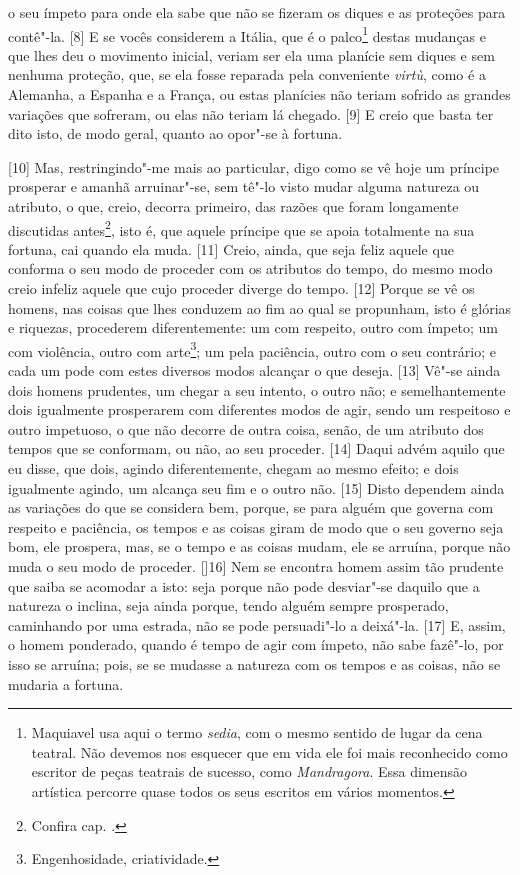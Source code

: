 o seu ímpeto para onde ela sabe que não se fizeram os diques e as
proteções para contê"-la. {[}8{]} E se vocês considerem a Itália, que é o
palco\footnote{Maquiavel usa aqui o termo \emph{sedia}, com o mesmo
  sentido de lugar da cena teatral. Não devemos nos esquecer que em vida
  ele foi mais reconhecido como escritor de peças teatrais de sucesso,
  como \emph{Mandragora}. Essa dimensão artística percorre quase todos
  os seus escritos em vários momentos.} destas mudanças e que lhes deu o
movimento inicial, veriam ser ela uma planície sem diques e sem nenhuma
proteção, que, se ela fosse reparada pela conveniente \emph{virtù}, como
é a Alemanha, a Espanha e a França, ou estas planícies não teriam
sofrido as grandes variações que sofreram, ou elas não teriam lá
chegado. {[}9{]} E creio que basta ter dito isto, de modo geral, quanto
ao opor"-se à fortuna.

{[}10{]} Mas, restringindo"-me mais ao particular, digo como se vê hoje
um príncipe prosperar e amanhã arruinar"-se, sem tê"-lo visto mudar alguma
natureza ou atributo, o que, creio, decorra primeiro, das razões que
foram longamente discutidas antes\footnote{Confira cap. .}, isto é,
que aquele príncipe que se apoia totalmente na sua fortuna, cai quando
ela muda. {[}11{]} Creio, ainda, que seja feliz aquele que conforma o
seu modo de proceder com os atributos do tempo, do mesmo modo creio
infeliz aquele que cujo proceder diverge do tempo. {[}12{]} Porque se vê
os homens, nas coisas que lhes conduzem ao fim ao qual se propunham,
isto é glórias e riquezas, procederem diferentemente: um com respeito,
outro com ímpeto; um com violência, outro com arte\footnote{Engenhosidade,
  criatividade.}; um pela paciência, outro com o seu contrário; e cada
um pode com estes diversos modos alcançar o que deseja. {[}13{]} Vê"-se
ainda dois homens prudentes, um chegar a seu intento, o outro não; e
semelhantemente dois igualmente prosperarem com diferentes modos de
agir, sendo um respeitoso e outro impetuoso, o que não decorre de outra
coisa, senão, de um atributo dos tempos que se conformam, ou não, ao seu
proceder. {[}14{]} Daqui advém aquilo que eu disse, que dois, agindo
diferentemente, chegam ao mesmo efeito; e dois igualmente agindo, um
alcança seu fim e o outro não. {[}15{]} Disto dependem ainda as
variações do que se considera bem, porque, se para alguém que governa
com respeito e paciência, os tempos e as coisas giram de modo que o seu
governo seja bom, ele prospera, mas, se o tempo e as coisas mudam, ele
se arruína, porque não muda o seu modo de proceder. {[]}16{]} Nem se encontra homem assim tão prudente que saiba se acomodar a isto: seja porque não pode desviar"-se daquilo que a natureza o inclina, seja ainda porque, tendo alguém sempre prosperado, caminhando por uma estrada, não se pode persuadi"-lo a deixá"-la. {[}17{]} E, assim, o homem ponderado, quando é tempo de agir com ímpeto, não sabe fazê"-lo, por isso se arruína; pois, se se mudasse a natureza com os tempos e as coisas, não se mudaria a fortuna.

